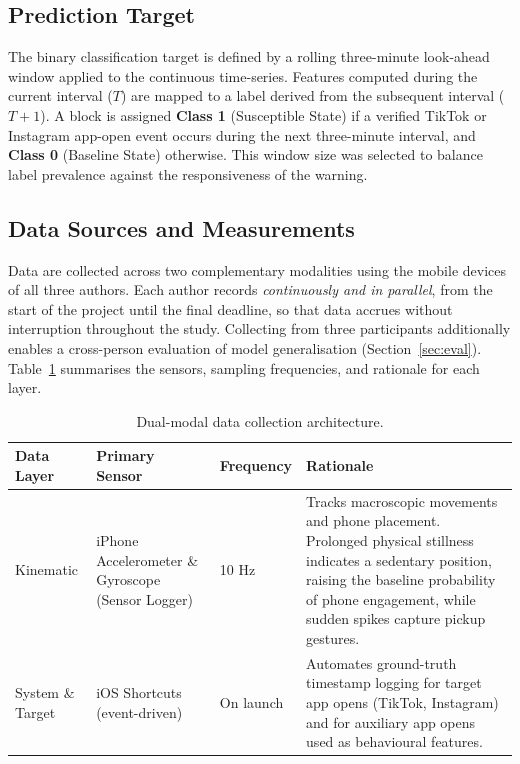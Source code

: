 \documentclass[runningheads]{llncs}
\begin{document}
\subsection{Prediction Target}

The binary classification target is defined by a rolling three-minute look-ahead window
applied to the continuous time-series. Features computed during the current interval ($T$)
are mapped to a label derived from the subsequent interval ($T{+}1$). A block is assigned
\textbf{Class 1} (Susceptible State) if a verified TikTok or Instagram app-open event occurs
during the next three-minute interval, and \textbf{Class 0} (Baseline State) otherwise. This
window size was selected to balance label prevalence against the responsiveness of the
warning.

\subsection{Data Sources and Measurements}

Data are collected across two complementary modalities using the mobile devices of all
three authors. Each author records \emph{continuously and in parallel}, from the start of
the project until the final deadline, so that data accrues without interruption throughout
the study. Collecting from three participants additionally enables a cross-person evaluation
of model generalisation (Section~\ref{sec:eval}). Table~\ref{tab:data_layers} summarises the
sensors, sampling frequencies, and rationale for each layer.

\begin{table}[t]
\caption{Dual-modal data collection architecture.}\label{tab:data_layers}
\begin{tabular}{@{}p{2.6cm}p{2.8cm}p{1.8cm}p{4.6cm}@{}}
\toprule
\textbf{Data Layer} & \textbf{Primary Sensor} & \textbf{Frequency} & \textbf{Rationale} \\
\midrule
Kinematic           & iPhone Accelerometer \& Gyroscope (Sensor Logger) & 10 Hz &
    Tracks macroscopic movements and phone placement. Prolonged physical stillness indicates
    a sedentary position, raising the baseline probability of phone engagement, while sudden
    spikes capture pickup gestures. \\
\addlinespace
System \& Target    & iOS Shortcuts (event-driven) & On launch &
    Automates ground-truth timestamp logging for target app opens (TikTok, Instagram) and
    for auxiliary app opens used as behavioural features. \\
\bottomrule
\end{tabular}
\end{table}
\end{document}
